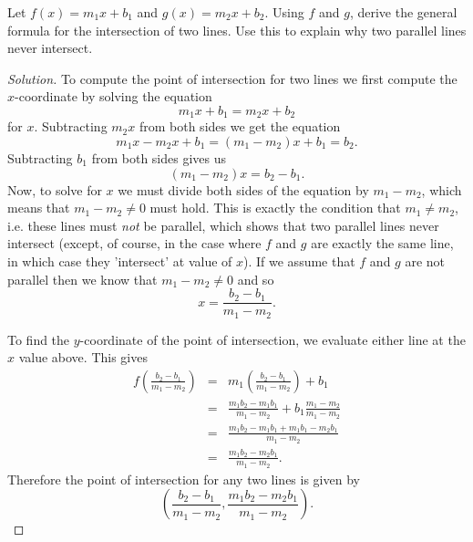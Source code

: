 \documentclass[12pt]{amsart}
\begin{document}
\begin{thm}\label{bonus}
  Let $f\left(x\right) = m_1x + b_1$ and $g\left(x\right) = m_2x + b_2$.
  Using $f$ and $g$, derive the general formula for the intersection of two lines.
  Use this to explain why two parallel lines never intersect.
  
  \begin{proof}[Solution]
    To compute the point of intersection for two lines we first compute the $x$-coordinate by solving the equation
    $$m_1x + b_1 = m_2x + b_2$$
    for $x$.
    Subtracting $m_2x$ from both sides we get the equation
    $$m_1x - m_2x + b_1 = (m_1 - m_2)x + b_1 = b_2.$$
    Subtracting $b_1$ from both sides gives us
    $$(m_1 - m_2)x = b_2 - b_1.$$
    Now, to solve for $x$ we must divide both sides of the equation by $m_1 - m_2$, which means that $m_1 - m_2 \neq 0$ must hold.
    This is exactly the condition that $m_1 \neq m_2$, i.e. these lines must {\it not} be parallel, which shows that two parallel lines never intersect (except, of course, in the case where $f$ and $g$ are exactly the same line, in which case they 'intersect' at value of $x$).
    If we assume that $f$ and $g$ are not parallel then we know that $m_1 - m_2 \neq 0$ and so 
    $$x = \frac{b_2 - b_1}{m_1 - m_2}.$$

    To find the $y$-coordinate of the point of intersection, we evaluate either line at the $x$ value above.
    This gives
    \begin{eqnarray*}
      f\left(\frac{b_2 - b_1}{m_1 - m_2}\right) &=& m_1\left(\frac{b_2 - b_1}{m_1 - m_2}\right) + b_1\\
      &=& \frac{m_1b_2 - m_1b_1}{m_1 - m_2} + b_1\frac{m_1 - m_2}{m_1 - m_2}\\
      &=& \frac{m_1b_2 - m_1b_1 + m_1b_1 - m_2b_1}{m_1 - m_2}\\
      &=& \frac{m_1b_2 - m_2b_1}{m_1 - m_2}.
    \end{eqnarray*}
    Therefore the point of intersection for any two lines is given by
    $$\left(\frac{b_2 - b_1}{m_1 - m_2}, \frac{m_1b_2 - m_2b_1}{m_1 - m_2}\right).$$
  \end{proof}
\end{thm}
\end{document}
